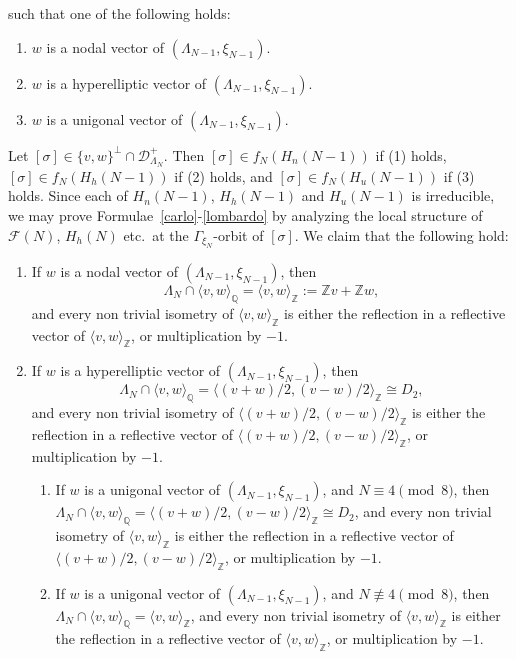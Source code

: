 \documentclass[11pt]{amsart}
\numberwithin{equation}{subsection}
\theoremstyle{plain}
\theoremstyle{remark}
\theoremstyle{definition}
\newcommand{\cD}{{\mathscr D}}
\newcommand{\cF}{{\mathscr F}}
\newcommand{\la}{\langle}
\newcommand{\QQ}{{\mathbb Q}}
\newcommand{\ra}{\rangle}
\newcommand{\ZZ}{{\mathbb Z}}
\begin{document}
such that one of the following holds:
%
\begin{enumerate}
%
\item
%
$w$ is a nodal vector of $(\Lambda_{N-1},\xi_{N-1})$.
%
\item
%
$w$ is  a hyperelliptic vector  of $(\Lambda_{N-1},\xi_{N-1})$.
%
\item
%
$w$ is  a unigonal vector  of $(\Lambda_{N-1},\xi_{N-1})$. 
% 
\end{enumerate}
%
Let   $[\sigma]\in \{v,w\}^{\bot}\cap\cD_{\Lambda_N}^{+}$. Then $[\sigma]\in f_N(H_n(N-1))$ if (1) holds,  $[\sigma]\in f_N(H_h(N-1))$ if (2) holds, and  $[\sigma]\in f_N(H_u(N-1))$ if (3) holds.  Since each of  $H_n(N-1)$, $H_h(N-1)$ and $H_u(N-1)$ is irreducible, we may prove Formulae~\eqref{carlo}-\eqref{lombardo} by analyzing the local structure of $\cF(N)$, $H_h(N)$ etc.~at the $\Gamma_{\xi_N}$-orbit of $[\sigma]$. 
We  claim that the following hold:
%
\begin{enumerate}
%
\item[($1'$)]
%
If $w$ is a nodal vector of $(\Lambda_{N-1},\xi_{N-1})$, then 
%
\begin{equation*}
%
\Lambda_N\cap \la v,w\ra_{\QQ}=\la v,w\ra_{\ZZ}:=\ZZ v+\ZZ w,
%
\end{equation*}
%
and  every non trivial isometry of $\la v,w\ra_{\ZZ}$ is either the reflection  in a reflective vector of $\la v,w\ra_{\ZZ}$, or multiplication by $-1$.
%
\item[($2'$)]
%
If $w$ is  a hyperelliptic vector  of $(\Lambda_{N-1},\xi_{N-1})$,  then 
%
\begin{equation*}
%
\Lambda_N\cap \la v,w\ra_{\QQ}=\la (v+w)/2,(v-w)/2\ra_{\ZZ}\cong D_2,
%
\end{equation*}
%
and  every non trivial isometry of $\la (v+w)/2,(v-w)/2\ra_{\ZZ}$ is either the reflection  in a reflective vector of $\la (v+w)/2,(v-w)/2\ra_{\ZZ}$, or multiplication by $-1$.
%
%
\begin{enumerate}
%
\item[($3a'$)]
%
If $w$ is  a unigonal vector  of $(\Lambda_{N-1},\xi_{N-1})$, and $N\equiv 4\pmod{8}$, then  $\Lambda_N\cap \la v,w\ra_{\QQ}=\la (v+w)/2,(v-w)/2\ra_{\ZZ}\cong D_2$, and   every non trivial isometry of $\la v,w\ra_{\ZZ}$ is either the reflection  in a reflective vector of $\la (v+w)/2,(v-w)/2\ra_{\ZZ}$, or multiplication by $-1$. 
%
\item[($3b'$)]
%
If $w$ is  a unigonal vector  of $(\Lambda_{N-1},\xi_{N-1})$, and $N\not\equiv 4\pmod{8}$, then  $\Lambda_N\cap \la v,w\ra_{\QQ}=\la v,w\ra_{\ZZ}$, and   every non trivial isometry of $\la v,w\ra_{\ZZ}$ is either the reflection  in a reflective vector of $\la v,w\ra_{\ZZ}$, or multiplication by $-1$. 
% 
\end{enumerate}
%
% 
\end{enumerate}
\end{document}
